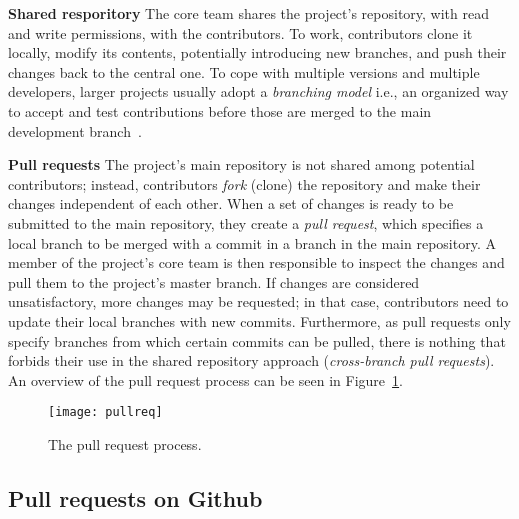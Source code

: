 \documentclass{sig-alternate}
\begin{document}
\textbf{Shared resporitory}
    The core team shares the project's repository, with read and write
    permissions, with the contributors. To work, contributors clone it locally,
    modify its contents, potentially introducing new branches, and push their
    changes back to the central one. To cope with multiple versions and multiple
    developers, larger projects usually adopt a {\em branching model} i.e., an
    organized way to accept and test contributions before those are merged to
    the main development branch~\cite{Bird12}. 
    

\textbf{Pull requests}
    The project's main repository is not shared among potential contributors;
    instead, contributors \emph{fork} (clone) the repository and make their
    changes independent of each other. When a set of changes is ready to be
    submitted to the main repository, they create a \emph{pull request}, which
    specifies a local branch to be merged with a commit in a branch in the main
    repository. A member of the project's core team is then responsible to
    inspect the changes and pull them to the project's master branch. If changes
    are considered unsatisfactory, more changes may be requested; in that case,
    contributors need to update their local branches with new commits.
    Furthermore, as pull requests only specify branches from which certain
    commits can be pulled, there is nothing that forbids their use in the shared
    repository approach (\emph{cross-branch pull requests}). An overview of the
    pull request process can be seen in Figure~\ref{fig:pullreq-process}.

    \begin{figure}[t]
      \begin{center}
        \texttt{[image: pullreq]}
      \end{center}
      \caption{The pull request process.}
      \label{fig:pullreq-process}
    \end{figure}

\subsection{Pull requests on Github}
\end{document}
